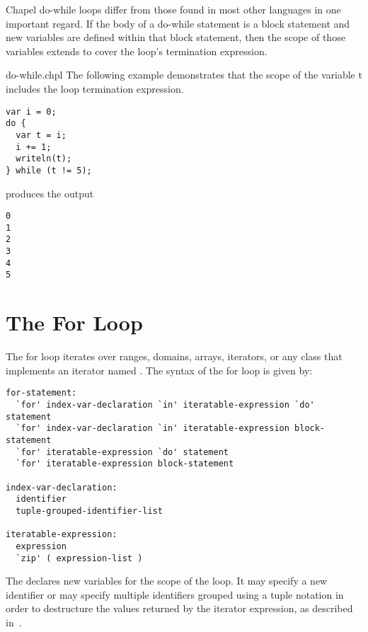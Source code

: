 \pagebreak
Chapel do-while loops differ from those found in most other languages in
one important regard.  If the body of a do-while statement is a block
statement and new variables are defined within that block statement,
then the scope of those variables extends to cover the loop's
termination expression.
\begin{chapelexample}{do-while.chpl}
The following example demonstrates that the scope of the variable t
includes the loop termination expression.
\begin{chapel}
\begin{verbatim}
var i = 0;
do {
  var t = i;
  i += 1;
  writeln(t);
} while (t != 5);
\end{verbatim}
\end{chapel}
produces the output
\begin{chapelprintoutput}
\begin{verbatim}
0
1
2
3
4
5
\end{verbatim}
\end{chapelprintoutput}
\end{chapelexample}


\section{The For Loop}
\label{The_For_Loop}

The for loop iterates over ranges, domains, arrays, iterators, or any
class that implements an iterator named .  The syntax of
the for loop is given by:
\begin{syntax}
\begin{verbatim}
for-statement:
  `for' index-var-declaration `in' iteratable-expression `do' statement
  `for' index-var-declaration `in' iteratable-expression block-statement
  `for' iteratable-expression `do' statement
  `for' iteratable-expression block-statement

index-var-declaration:
  identifier
  tuple-grouped-identifier-list

iteratable-expression:
  expression
  `zip' ( expression-list )
\end{verbatim}
\end{syntax}

The  declares new variables for the scope
of the loop.  It may specify a new identifier or may specify multiple
identifiers grouped using a tuple notation in order to destructure the
values returned by the iterator expression, as described
in~.


